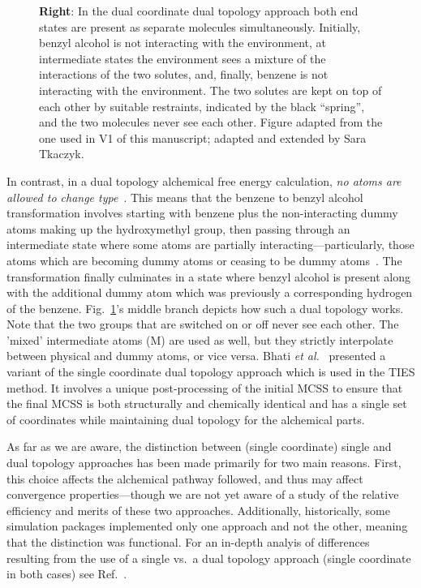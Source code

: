 \documentclass[9pt,bestpractices]{livecoms}
\newcommand{\sbnote}[1]{%
  {\bfseries{}[SB: }%
  {\textcolor{blue}{#1}}{\bfseries{}]}
}
\begin{document}
\begin{figure}
{      %
\textbf{Right}: In the dual coordinate dual topology approach both end states are present as separate molecules simultaneously.  Initially, benzyl alcohol is not interacting with the environment, at intermediate states the environment sees a mixture of the interactions of the two solutes, and, finally, benzene is not interacting with the environment. The two solutes are kept on top of each other by suitable restraints, indicated by the black ``spring'', and  the two molecules never see each other.  Figure adapted from the one used in V1 of this manuscript; adapted and extended by Sara Tkaczyk.
    }
    \label{fig:fig_topology}
\end{figure} 

In contrast, in a dual topology alchemical free energy calculation, \emph{no atoms are allowed to change type}~\cite{boresch1999role, shirts2012best}. This means that the benzene to benzyl alcohol transformation involves starting with benzene plus the non-interacting dummy atoms making up the hydroxymethyl group, then passing through an intermediate state where some atoms are partially interacting---particularly, those atoms which are becoming dummy atoms or ceasing to be dummy atoms~\cite{mobley2014blind}. The transformation finally culminates in a state where benzyl alcohol is present along with the additional dummy atom which was previously a corresponding hydrogen of the benzene. Fig.~\ref{fig:fig_topology}'s middle branch depicts how such a dual topology works. Note that the two groups that are switched on or off never see each other. The 'mixed' intermediate atoms (M) are used as well, but they strictly interpolate between physical and dummy atoms, or vice versa.
Bhati \textit{et al.}~\cite{bhati2017, bieniek2021} presented a variant of the single coordinate dual topology approach which is used in the TIES method. It involves a unique post-processing of the initial MCSS to ensure that the final MCSS is both structurally and chemically identical and has a single set of coordinates while maintaining dual topology for the alchemical parts.

As far as we are aware, the distinction between (single coordinate) single and dual topology approaches has been made primarily for two main reasons. First, this choice affects the alchemical pathway followed, and thus may affect convergence properties---though we are not yet aware of a study of the relative efficiency and merits of these two approaches. Additionally, historically, some simulation packages implemented only one approach and not the other, meaning that the distinction was functional. For an in-depth analyis of differences resulting from the use of a  single vs.\ a dual topology approach (single coordinate in both cases) see Ref.~\cite{Boresch_2002}.
\end{document}
